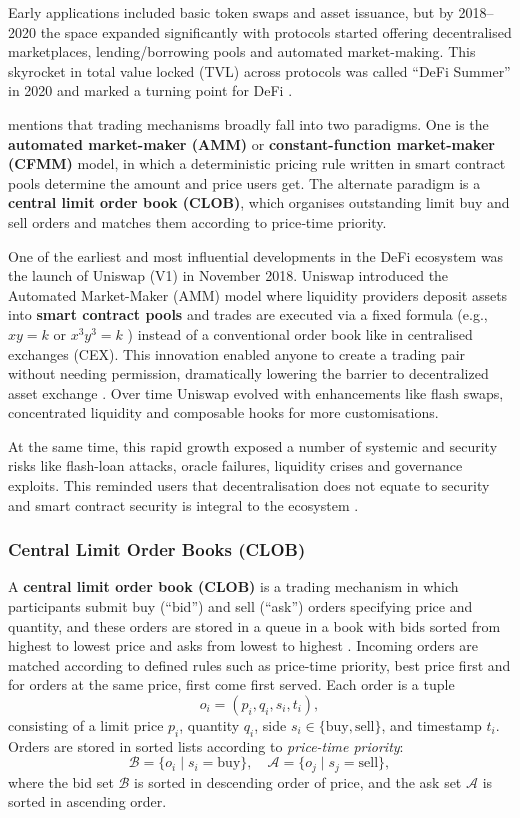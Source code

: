 \documentclass[12pt,a4paper]{article}
\begin{document}
Early applications included basic token swaps and asset issuance, but by 2018–2020 the space expanded significantly with protocols started offering decentralised marketplaces, lending/borrowing pools and automated market-making. This skyrocket in total value locked (TVL) across protocols was called “DeFi Summer” in 2020 and marked a turning point for DeFi \parencite{fang2021defi}.

\textcite{hagele2024centralized} mentions that trading mechanisms broadly fall into two paradigms. One is the \textbf{automated market-maker (AMM)} or \textbf{constant-function market-maker (CFMM)} model, in which a deterministic pricing rule written in smart contract pools determine the amount and price users get. The alternate paradigm is a \textbf{central limit order book (CLOB)}, which organises outstanding limit buy and sell orders and matches them according to price‐time priority. 

One of the earliest and most influential developments in the DeFi ecosystem was the launch of Uniswap (V1) in November 2018. Uniswap introduced the Automated Market-Maker (AMM) model where liquidity providers deposit assets into \textbf{smart contract pools} and trades are executed via a fixed formula (e.g., $xy = k$ or $x^3y^3=k$ ) instead of a conventional order book like in centralised exchanges (CEX). This innovation enabled anyone to create a trading pair without needing permission, dramatically lowering the barrier to decentralized asset exchange \parencite{adams2021uniswap}. Over time Uniswap evolved with enhancements like flash swaps, concentrated liquidity and composable hooks for more customisations.

At the same time, this rapid growth exposed a number of systemic and security risks like flash-loan attacks, oracle failures, liquidity crises and governance exploits. This reminded users that decentralisation does not equate to security and smart contract security is integral to the ecosystem \parencite{kaur2023smart}. 

\subsubsection{Central Limit Order Books (CLOB)}
A \textbf{central limit order book (CLOB)} is a trading mechanism in which participants submit buy (“bid”) and sell (“ask”) orders specifying price and quantity, and these orders are stored in a queue in a book with bids sorted from highest to lowest price and asks from lowest to highest \parencite{hagele2024centralized}. Incoming orders are matched according to defined rules such as price-time priority, best price first and for orders at the same price, first come first served.
Each order is a tuple 
\[o_i = (p_i, q_i, s_i, t_i),\]
consisting of a limit price \(p_i\), quantity \(q_i\), side \(s_i \in \{\text{buy}, \text{sell}\}\), and timestamp \(t_i\). Orders are stored in sorted lists according to \textit{price-time priority}:
\[
\mathcal{B} = \{o_i \mid s_i = \text{buy}\}, \quad 
\mathcal{A} = \{o_j \mid s_j = \text{sell}\},
\]
where the bid set \(\mathcal{B}\) is sorted in descending order of price, and the ask set \(\mathcal{A}\) is sorted in ascending order. 
\end{document}

